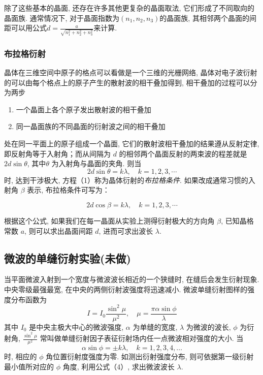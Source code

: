 \documentclass[zihao=5, UTF8]{article}
\theoremstyle{MyLineTheoremStyle} %
\theoremstyle{MyBlockTheoremStyle} %
\theoremstyle{MySubsubsectionStyle} %
\begin{document}
除了这些基本的晶面, 还存在许多其他更复杂的晶面取法, 它们形成了不同取向的晶面族. 通常情况下, 对于晶面指数为$(n_1, n_2, n_3)$的晶面族, 其相邻两个晶面的间距可以用公式$d=\frac{a}{\sqrt{n_1^2+n_2^2+n_3^2}}$来计算. 

\subsubsection{布拉格衍射}
晶体在三维空间中原子的格点可以看做是一个三维的光栅网络, 晶体对电子波衍射的可以由每个格点上的原子产生的散射波的相干叠加得到, 相干叠加的过程可以分为两步
\begin{enumerate}
    \item 一个晶面上各个原子发出散射波的相干叠加  
    \item 同一晶面族的不同晶面的衍射波之间的相干叠加
\end{enumerate}

处在同一平面上的原子组成一个晶面, 它们的散射波相干叠加的结果遵从反射定律, 即反射角等于入射角；而从间隔为 $d$ 的相邻两个晶面反射的两束波的程差就是 $2d\sin\theta$, 其中$\theta$ 为入射角与晶面的夹角. 则当
\begin{equation}
2d \sin\theta = k\lambda, \quad k=1, 2, 3, \cdots 
\end{equation}
时, 达到干涉极大, 方程（1）称为晶体衍射的\textit{布拉格条件}. 如果改成通常习惯的入射角 $\beta$ 表示, 布拉格条件可写为：

\begin{equation}
2d \cos\beta = k\lambda, \quad k=1, 2, 3, \cdots 
\end{equation}

根据这个公式, 如果我们在每一晶面从实验上测得衍射极大的方向角 $\beta$, 已知晶格常数 $a$, 则可以求出晶面间距 $d$, 进而可求出波长 $\lambda$. 

\subsection{微波的单缝衍射实验(未做)}
当平面微波入射到一个宽度与微波波长相近的一个狭缝时, 在缝后会发生衍射现象. 中央零级最强最宽, 在中央的两侧衍射波强度将迅速减小. 微波单缝衍射图样的强度分布函数为
\begin{equation}
I = I_0 \frac{\sin^2 \mu}{\mu^2}, \quad \mu = \frac{\pi \alpha \sin \phi}{\lambda}
\end{equation}
其中 $I_0$ 是中央主极大中心的微波强度, $\alpha$ 为单缝的宽度, $\lambda$ 为微波的波长, $\phi$ 为衍射角, $\frac{\sin^2 \mu}{\mu^2}$ 常叫做单缝衍射因子表征衍射场内任一点微波相对强度的大小. 当
\begin{equation}
\alpha \sin \phi = \pm k \lambda, \quad k = 1, 2, 3, 4, \ldots
\end{equation}
时, 相应的 $\phi$ 角位置衍射度强度为零. 如测出衍射强度分布, 则可依据第一级衍射最小值所对应的 $\phi$ 角度, 利用公式（4）, 求出微波波长 $\lambda$. 
\end{document}

